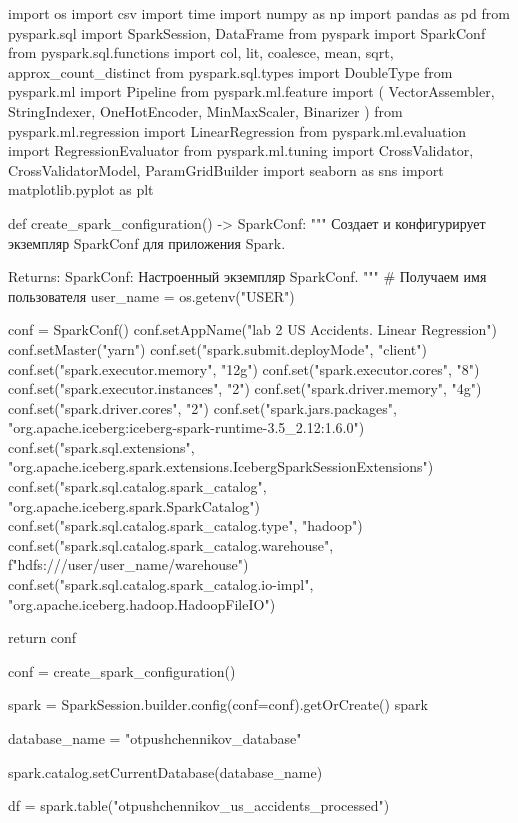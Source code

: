 \begin{code}
import os
import csv
import time
import numpy as np
import pandas as pd
from pyspark.sql import SparkSession, DataFrame
from pyspark import SparkConf
from pyspark.sql.functions import col, lit, coalesce, mean, sqrt, approx_count_distinct
from pyspark.sql.types import DoubleType
from pyspark.ml import Pipeline
from pyspark.ml.feature import (
    VectorAssembler,
    StringIndexer,
    OneHotEncoder,
    MinMaxScaler,
    Binarizer
)
from pyspark.ml.regression import LinearRegression
from pyspark.ml.evaluation import RegressionEvaluator
from pyspark.ml.tuning import CrossValidator, CrossValidatorModel, ParamGridBuilder
import seaborn as sns
import matplotlib.pyplot as plt

def create_spark_configuration() -> SparkConf:
    """
    Создает и конфигурирует экземпляр SparkConf для приложения Spark.

    Returns:
        SparkConf: Настроенный экземпляр SparkConf.
    """
    # Получаем имя пользователя
    user_name = os.getenv("USER")

    conf = SparkConf()
    conf.setAppName("lab 2 US Accidents. Linear Regression")
    conf.setMaster("yarn")
    conf.set("spark.submit.deployMode", "client")
    conf.set("spark.executor.memory", "12g")
    conf.set("spark.executor.cores", "8")
    conf.set("spark.executor.instances", "2")
    conf.set("spark.driver.memory", "4g")
    conf.set("spark.driver.cores", "2")
    conf.set("spark.jars.packages",
             "org.apache.iceberg:iceberg-spark-runtime-3.5_2.12:1.6.0")
    conf.set("spark.sql.extensions",
             "org.apache.iceberg.spark.extensions.IcebergSparkSessionExtensions")
    conf.set("spark.sql.catalog.spark_catalog",
             "org.apache.iceberg.spark.SparkCatalog")
    conf.set("spark.sql.catalog.spark_catalog.type", "hadoop")
    conf.set("spark.sql.catalog.spark_catalog.warehouse",
             f"hdfs:///user/{user_name}/warehouse")
    conf.set("spark.sql.catalog.spark_catalog.io-impl",
             "org.apache.iceberg.hadoop.HadoopFileIO")

    return conf

conf = create_spark_configuration()

spark = SparkSession.builder.config(conf=conf).getOrCreate()
spark

database_name = "otpushchennikov_database"

spark.catalog.setCurrentDatabase(database_name)

df = spark.table("otpushchennikov_us_accidents_processed")


\end{code}
